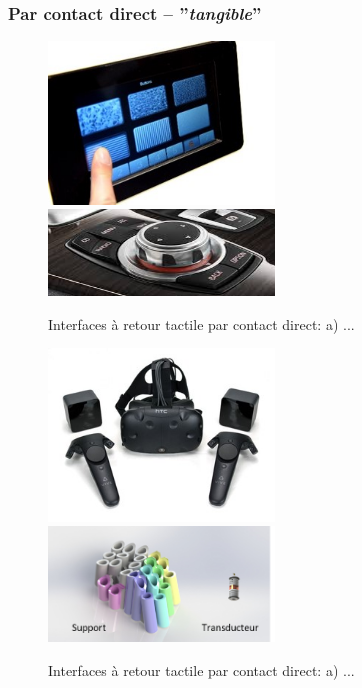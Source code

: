 \subsubsection{Par contact direct -- ''\textit{tangible}''}
\begin{figure}[!h]
	\centering
	\includegraphics[width=6cm]{1_Bible/Photos/Apparatus/tangible_cea_e-t.jpg}\hspace{2cm}
	\includegraphics[width=6cm]{1_Bible/Photos/Apparatus/tangible_cea_magneto.png}
	\caption{Interfaces à retour tactile par contact direct: a) ... }\label{int_retourd_1}
\end{figure}
\begin{figure}[!h]
	\centering
	\includegraphics[width=6cm]{1_Bible/Photos/Apparatus/tangible_vive.jpg}\hspace{2cm}
	\includegraphics[width=6cm]{1_Bible/Photos/Apparatus/tangible_com_hapt.png}
	\caption{Interfaces à retour tactile par contact direct: a) ... }\label{int_retourd_2}
\end{figure}

